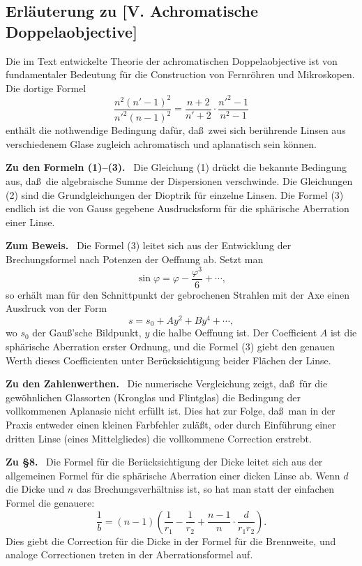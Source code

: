\documentclass[12pt,a4paper]{article}
\theoremstyle{plain}
\theoremstyle{definition}
\theoremstyle{remark}
\begin{document}
\subsection*{Erl\"auterung zu [V. Achromatische Doppelaobjective]}

Die im Text entwickelte Theorie der achromatischen
Doppelaobjective ist von fundamentaler Bedeutung f\"ur die
Construction von Fernr\"ohren und Mikroskopen. Die dortige Formel
\[
\frac{n^{2}(n'-1)^{2}}{n'^{2}(n-1)^{2}} =
\frac{n+2}{n'+2}\cdot\frac{n'^{2}-1}{n^{2}-1}
\]
enth\"alt die nothwendige Bedingung daf\"ur, da\ss\ zwei sich
ber\"uhrende Linsen aus verschiedenem Glase zugleich achromatisch
und aplanatisch sein k\"onnen.

\textbf{Zu den Formeln (1)--(3).} \ Die Gleichung (1) dr\"uckt die
bekannte Bedingung aus, da\ss\ die algebraische Summe der
Dispersionen verschwinde. Die Gleichungen (2) sind die
Grundgleichungen der Dioptrik f\"ur einzelne Linsen. Die Formel (3)
endlich ist die von {\sc Gauss} gegebene Ausdrucksform f\"ur die
sph\"arische Aberration einer Linse.

\textbf{Zum Beweis.} \ Die Formel (3) leitet sich aus der Entwicklung
der Brechungsformel nach Potenzen der Oeffnung ab. Setzt man
\[
\sin\varphi = \varphi - \frac{\varphi^{3}}{6} + \cdots,
\]
so erh\"alt man f\"ur den Schnittpunkt der gebrochenen Strahlen mit
der Axe einen Ausdruck von der Form
\[
s = s_{0} + Ay^{2} + By^{4} + \cdots,
\]
wo $s_{0}$ der Gau\ss'sche Bildpunkt, $y$ die halbe Oeffnung ist.
Der Coefficient $A$ ist die sph\"arische Aberration erster Ordnung,
und die Formel (3) giebt den genauen Werth dieses Coefficienten
unter Ber\"ucksichtigung beider Fl\"achen der Linse.

\textbf{Zu den Zahlenwerthen.} \ Die numerische Vergleichung zeigt,
da\ss\ f\"ur die gew\"ohnlichen Glassorten (Kronglas und Flintglas)
die Bedingung der vollkommenen Aplanasie nicht erf\"ullt ist. Dies
hat zur Folge, da\ss\ man in der Praxis entweder einen kleinen
Farbfehler zul\"a\ss t, oder durch Einf\"uhrung einer dritten Linse
(eines Mittelgliedes) die vollkommene Correction erstrebt.

\textbf{Zu \S 8.} \ Die Formel f\"ur die Ber\"ucksichtigung der Dicke
leitet sich aus der allgemeinen Formel f\"ur die sph\"arische
Aberration einer dicken Linse ab. Wenn $d$ die Dicke und $n$ das
Brechungsverh\"altniss ist, so hat man statt der einfachen Formel
die genauere:
\[
\frac{1}{b} = (n-1)\left(\frac{1}{r_{1}} - \frac{1}{r_{2}}
+ \frac{n-1}{n}\cdot\frac{d}{r_{1}r_{2}}\right).
\]
Dies giebt die Correction f\"ur die Dicke in der Formel f\"ur die
Brennweite, und analoge Correctionen treten in der Aberrationsformel
auf.
\end{document}
